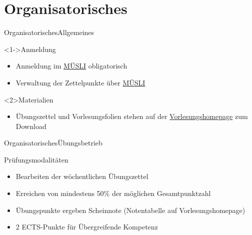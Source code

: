 \documentclass[
	vorläufig=false,
	datum=2018-10-15,
	titel={Einführung und grundlegende Bedienung},
	web=true,
	sebbo,
	aspectratio=1610,
]{../tex/latexkurs-slides}
\begin{document}
\section{Organisatorisches}

\begin{frame}[t]{Organisatorisches}{Allgemeines}
	\begin{block}<1->{Anmeldung}
		\begin{itemize}
			\item	 Anmeldung im \href{https://muesli.mathi.uni-heidelberg.de/lecture/view/750}{MÜSLI} obligatorisch
			\item Verwaltung der Zettelpunkte über \href{https://muesli.mathi.uni-heidelberg.de/lecture/view/921}{MÜSLI}
		\end{itemize}
	\end{block}
	\begin{block}{Materialien}
		\begin{itemize}
			\item Übungszettel und Vorlesungsfolien stehen auf der \href{http://latexkurs.github.io}{Vorlesungshomepage} zum Download
		\end{itemize}
	\end{block}
\end{frame}

\begin{frame}[t]{Organisatorisches}{Übungsbetrieb}
	\begin{block}{Prüfungsmodalitäten}
		\begin{itemize}
			\item Bearbeiten der wöchentlichen Übungszettel
			\item Erreichen von mindestens 50\% der möglichen Gesamtpunktzahl
			\item Übungspunkte ergeben Scheinnote (Notentabelle auf Vorlesungshomepage) 
			\item 2 ECTS-Punkte für Übergreifende Kompetenz
		\end{itemize}
	\end{block}
\end{frame}
\end{document}
